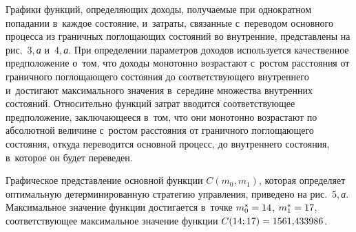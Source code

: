 \begin{multicols}{2}
Графики функций, определяющих доходы, по\-лу\-ча\-емые при однократном попадании 
в~каж\-дое со\-сто\-яние, и~за\-тра\-ты, связанные с~переводом основного процесса из 
граничных по\-гло\-ща\-ющих \mbox{со\-сто\-яний} во внут\-рен\-ние, пред\-став\-ле\-ны на рис.~3,\,\textit{а} и~4,\,\textit{а}. При 
определении па\-ра\-мет\-ров доходов используется качественное предположение о~том, 
что доходы монотонно воз\-рас\-та\-ют с~рос\-том рас\-сто\-яния от граничного по\-гло\-ща\-юще\-го 
со\-сто\-яния до со\-от\-вет\-ст\-ву\-юще\-го внут\-рен\-не\-го и~достигают максимального значения 
в~середине множества внут\-рен\-них состояний. Относительно функций затрат вводится 
со\-от\-вет\-ст\-ву\-ющее предположение, за\-клю\-ча\-юще\-еся в~том, что они монотонно воз\-рас\-та\-ют 
по абсолютной величине с~рос\-том рас\-сто\-яния от граничного по\-гло\-ща\-юще\-го со\-сто\-яния, 
откуда переводится основной процесс, до внут\-рен\-не\-го со\-сто\-яния, в~которое он 
будет переведен.


Графическое представление основной функции $C(m_0, m_1)$, которая определяет 
оптимальную детерминированную стратегию управ\-ле\-ния, приведено на рис.~5,\,\textit{а}. 
Максимальное значение функции достигается в~точке $m_0^*\hm=14$, $m_1^*\hm=17$, 
со\-от\-вет\-ст\-ву\-ющее максимальное значение функции $C(14;17) \hm= 1561{,}433986$.

\begin{figure*} %
 \vspace*{1pt}
 \begin{center}
    \mbox{%
 \epsfxsize=83.443mm 
 }
\end{center}
\vspace*{-11pt}
\vspace*{18pt}
  \begin{center}
 \mbox{%
 \epsfxsize=159.1mm 
 }
\end{center}
\vspace*{-9pt}
\end{figure*}


\smallskip


\end{multicols}

